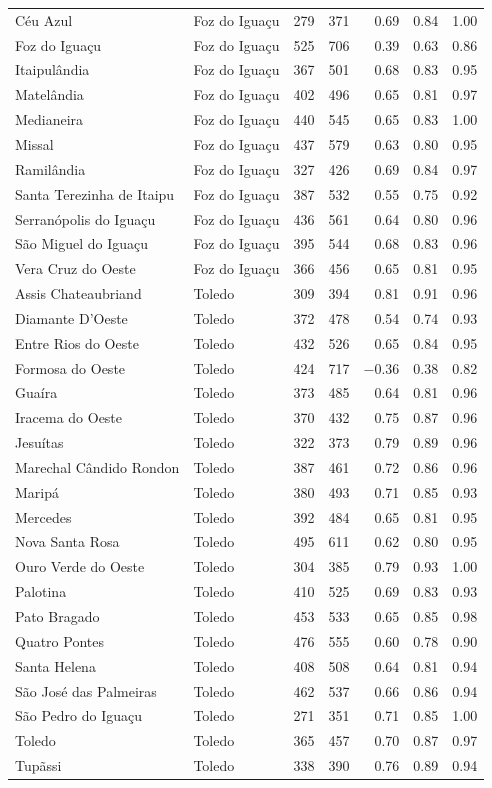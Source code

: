 \begin{longtable}{@{}llrrrrr@{}}
Céu Azul & Foz do Iguaçu & 279 & 371 & 0.69 & 0.84 & 1.00 \\
Foz do Iguaçu & Foz do Iguaçu & 525 & 706 & 0.39 & 0.63 & 0.86 \\
Itaipulândia & Foz do Iguaçu & 367 & 501 & 0.68 & 0.83 & 0.95 \\
Matelândia & Foz do Iguaçu & 402 & 496 & 0.65 & 0.81 & 0.97 \\
Medianeira & Foz do Iguaçu & 440 & 545 & 0.65 & 0.83 & 1.00 \\
Missal & Foz do Iguaçu & 437 & 579 & 0.63 & 0.80 & 0.95 \\
Ramilândia & Foz do Iguaçu & 327 & 426 & 0.69 & 0.84 & 0.97 \\
Santa Terezinha de Itaipu & Foz do Iguaçu & 387 & 532 & 0.55 & 0.75 & 0.92 \\
Serranópolis do Iguaçu & Foz do Iguaçu & 436 & 561 & 0.64 & 0.80 & 0.96 \\
São Miguel do Iguaçu & Foz do Iguaçu & 395 & 544 & 0.68 & 0.83 & 0.96 \\
Vera Cruz do Oeste & Foz do Iguaçu & 366 & 456 & 0.65 & 0.81 & 0.95 \\
Assis Chateaubriand & Toledo & 309 & 394 & 0.81 & 0.91 & 0.96 \\
Diamante D'Oeste & Toledo & 372 & 478 & 0.54 & 0.74 & 0.93 \\
Entre Rios do Oeste & Toledo & 432 & 526 & 0.65 & 0.84 & 0.95 \\
Formosa do Oeste & Toledo & 424 & 717 & $-$0.36 & 0.38 & 0.82 \\
Guaíra & Toledo & 373 & 485 & 0.64 & 0.81 & 0.96 \\
Iracema do Oeste & Toledo & 370 & 432 & 0.75 & 0.87 & 0.96 \\
Jesuítas & Toledo & 322 & 373 & 0.79 & 0.89 & 0.96 \\
Marechal Cândido Rondon & Toledo & 387 & 461 & 0.72 & 0.86 & 0.96 \\
Maripá & Toledo & 380 & 493 & 0.71 & 0.85 & 0.93 \\
Mercedes & Toledo & 392 & 484 & 0.65 & 0.81 & 0.95 \\
Nova Santa Rosa & Toledo & 495 & 611 & 0.62 & 0.80 & 0.95 \\
Ouro Verde do Oeste & Toledo & 304 & 385 & 0.79 & 0.93 & 1.00 \\
Palotina & Toledo & 410 & 525 & 0.69 & 0.83 & 0.93 \\
Pato Bragado & Toledo & 453 & 533 & 0.65 & 0.85 & 0.98 \\
Quatro Pontes & Toledo & 476 & 555 & 0.60 & 0.78 & 0.90 \\
Santa Helena & Toledo & 408 & 508 & 0.64 & 0.81 & 0.94 \\
São José das Palmeiras & Toledo & 462 & 537 & 0.66 & 0.86 & 0.94 \\
São Pedro do Iguaçu & Toledo & 271 & 351 & 0.71 & 0.85 & 1.00 \\
Toledo & Toledo & 365 & 457 & 0.70 & 0.87 & 0.97 \\
Tupãssi & Toledo & 338 & 390 & 0.76 & 0.89 & 0.94 \\
\bottomrule
\end{longtable}
\endgroup



